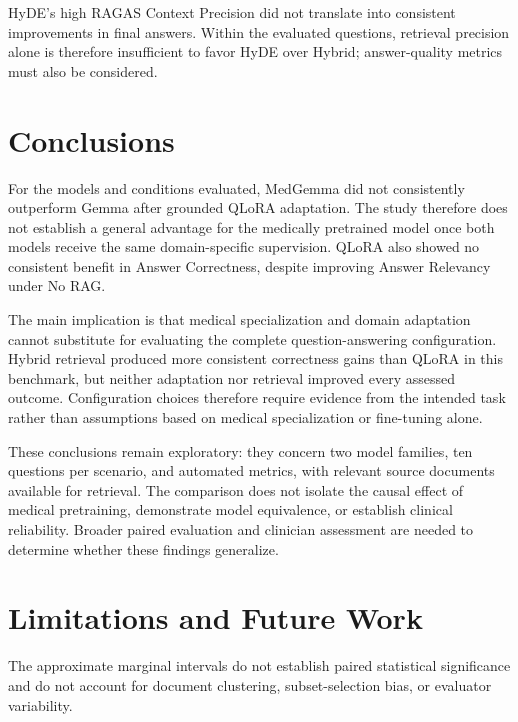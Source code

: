 HyDE's high RAGAS Context Precision did not translate into consistent
improvements in final answers. Within the evaluated questions, retrieval
precision alone is therefore insufficient to favor HyDE over Hybrid;
answer-quality metrics must also be considered.

\section{Conclusions}
For the models and conditions evaluated, MedGemma did not consistently
outperform Gemma after grounded QLoRA adaptation. The study therefore does not
establish a general advantage for the medically pretrained model once both
models receive the same domain-specific supervision. QLoRA also showed no
consistent benefit in Answer Correctness, despite improving Answer Relevancy
under No RAG.

The main implication is that medical specialization and domain adaptation
cannot substitute for evaluating the complete question-answering
configuration. Hybrid retrieval produced more consistent correctness gains
than QLoRA in this benchmark, but neither adaptation nor retrieval improved
every assessed outcome. Configuration choices therefore require evidence from
the intended task rather than assumptions based on medical specialization or
fine-tuning alone.

These conclusions remain exploratory: they concern two model families, ten
questions per scenario, and automated metrics, with relevant source documents
available for retrieval. The comparison does not isolate the causal effect of
medical pretraining, demonstrate model equivalence, or establish clinical
reliability. Broader paired evaluation and clinician assessment are needed to
determine whether these findings generalize.
\section{Limitations and Future Work}
The approximate marginal intervals do not establish paired statistical
significance and do not account for document clustering, subset-selection
bias, or evaluator variability.





